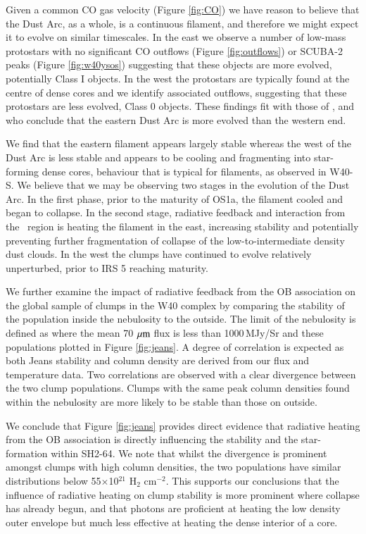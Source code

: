 Given a common CO gas velocity (Figure \ref{fig:CO}) we have reason to believe that the Dust 
Arc, as a whole, is a continuous filament, and therefore we might expect it to evolve on 
similar timescales. In the east we observe a number of low-mass protostars with no significant 
CO outflows (Figure \ref{fig:outflows}) or SCUBA-2 peaks (Figure \ref{fig:w40ysos}) suggesting that 
these objects are more evolved, potentially Class I objects. In the west the protostars are typically 
found at the centre of dense cores and we identify associated outflows, suggesting that these 
protostars are less evolved, Class 0 objects. These findings fit with those of  \cite{Maury:2011ys}, 
\cite{Mallick:2013kx} and \cite{Pirogov:2013ys} who conclude that the eastern Dust Arc is more 
evolved than the western end. 

We find that the eastern filament appears largely stable whereas the west of the Dust Arc is less 
stable and appears to be cooling and fragmenting into star-forming dense cores, behaviour that 
is typical for filaments, as observed in W40-S. We believe that we may be observing two stages 
in the evolution of the Dust Arc. In the first phase, prior to the maturity of OS1a, the filament cooled 
and began to collapse. In the second stage, radiative feedback and interaction from the \HII\ region 
is heating the filament in the east, increasing stability and potentially preventing further fragmentation 
of collapse of the low-to-intermediate density dust clouds. In the west the clumps have continued to 
evolve relatively unperturbed, prior to IRS 5 reaching maturity. 

We further examine the impact of radiative feedback from the OB association on the global 
sample of clumps in the W40 complex by comparing the stability of the population inside the 
nebulosity to the outside. The limit of the nebulosity is defined as where the mean 70\,$\,\mu\rm{m}$ 
flux is less than 1000\,MJy/Sr and these populations plotted in Figure \ref{fig:jeans}. A degree 
of correlation is expected as both Jeans stability and column density are derived from our flux 
and temperature data. Two correlations are observed with a clear divergence between the two 
clump populations. Clumps with the same peak column densities found within the nebulosity 
are more likely to be stable than those on outside.

We conclude that Figure \ref{fig:jeans} provides direct evidence that radiative heating from 
the OB association is directly influencing the stability and the star-formation within SH2-64. 
We note that whilst the divergence is prominent amongst clumps with high column densities, 
the two populations have similar distributions below 55$\times$10$^{21}$ H$_{2}$ cm$^{-2}$. 
This supports our conclusions that the influence of radiative heating on clump stability is more 
prominent where collapse has already begun, and that photons are proficient at heating the 
low density outer envelope but much less effective at heating the dense interior of a core.  

